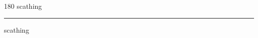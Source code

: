 
\begin{frame}
\begin{center}
\begin{turn}{180}
{\fontsize{2.5cm}{1em}\selectfont scathing}
\end{turn}
\vspace{1em}\par  
\hrule
\vspace{1em}\par  
{\fontsize{2.5cm}{1em}\selectfont scathing}
\end{center}
\end{frame}
